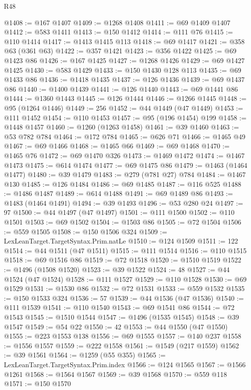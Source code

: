 \begin{lexlean}{R48}
\begin{coremodule}
@1408 := @167 @1407
@1409 := @1268 @1408
@1411 := @69 @1409 @1407
@1412 := @583 @1411
@1413 := @150 @1412
@1414 := @111 @76
@1415 := @110 @1414
@1417 := @1413 @1415 @113
@1418 := @69 @1417
@1421 := @358 @63 (@361 @63)
@1422 := @357 @1421
@1423 := @356 @1422
@1425 := @69 @1423 @86
@1426 := @167 @1425
@1427 := @1268 @1426
@1429 := @69 @1427 @1425
@1430 := @583 @1429
@1433 := @150 @1430 @128 @113
@1435 := @69 @1433 @86
@1436 := @1418 @1435
@1437 := @126 @1436
@1439 := @69 @1437 @86
@1440 := @1400 @1439
@1441 := @126 @1440
@1443 := @69 @1441 @86
@1444 := @1360 @1443
@1445 := @126 @1444
@1446 := @1266 @1445
@1448 := @95 (@1264 @1446)
@1449 := 256
@1452 := @44 @1449 (@47 @1449)
@1453 := @111 @1452
@1454 := @110 @1453
@1457 := @95 (@196 @1454) @199
@1458 := @1448 @1457
@1460 := @1260 (@1263 @1458)
@1461 := @39 @1460
@1463 := @53 @782 @784
@1464 := @172 @784
@1465 := @626 @71
@1466 := @1465 @49
@1467 := @69 @1466
@1468 := @1465 @66
@1469 := @69 @1468
@1470 := @1465 @76
@1472 := @69 @1470 @326
@1473 := @1469 @1472
@1474 := @1467 @1473
@1475 := @614 @1474
@1477 := @69 @1475 @86
@1479 := @1463 (@1464 @1477)
@1480 := @39 @1479
@1483 := @279 (@781 @27) @784
@1484 := @1467 @130
@1485 := @126 @1484
@1486 := @69 @1485
@1487 := @116 @525
@1488 := @1486 @1487
@1489 := @614 @1488
@1491 := @69 @1489 @86
@1493 := @1483 (@1464 @1491)
@1494 := @39 @1493
@1496 := @53 @280 @24
@1497 := 97
@1500 := @44 @1497 (@47 @1497)
@1501 := @111 @1500
@1502 := @110 @1501
@1503 := @69 @1502
@1504 := @1503 @86
@1505 := @72 @1504
@1506 := @559 @1505
@1508 := @150 @1506 @324
@1509 := LexLeanTarget.TargetSyntax.Prim.natLe
@1510 := @124 @1509
@1511 := 122
@1514 := @44 @1511 (@47 @1511)
@1515 := @111 @1514
@1516 := @110 @1515
@1518 := @69 @1516 @86
@1519 := @72 @1518
@1520 := @1510 @1519
@1522 := @1496 (@1508 @1520)
@1523 := @39 @1522
@1524 := 48
@1527 := @44 @1524 (@47 @1524)
@1528 := @111 @1527
@1529 := @110 @1528
@1530 := @69 @1529
@1531 := @1530 @86
@1532 := @72 @1531
@1533 := @559 @1532
@1535 := @150 @1533 @324
@1536 := 57
@1539 := @44 @1536 (@47 @1536)
@1540 := @111 @1539
@1541 := @110 @1540
@1543 := @69 @1541 @86
@1544 := @72 @1543
@1545 := @1510 @1544
@1547 := @1496 (@1535 @1545)
@1548 := @39 @1547
@1549 := @54 @22
@1550 := 42
@1553 := @44 @1550 (@47 @1550)
@1555 := @223 @1553 @138
@1556 := @69 @1555
@1557 := @140 @237
@1558 := @1556 @1557
@1559 := @222 @1558
@1561 := @1549 (@217 @1559)
@1562 := @39 @1561
@1564 := @1259 (@55 @355)
@1565 := LexLeanTarget.TargetSyntax.Prim.index
@1566 := @124 @1565
@1567 := @1566 @1261
@1568 := @1564 @1567
@1569 := @39 @1568
@1570 := @559 @118
@1571 := @150 @1570

\end{coremodule}
\end{lexlean}
